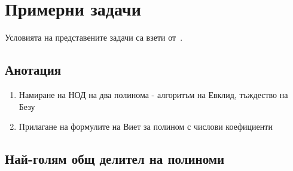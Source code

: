 \documentclass[numbers=endperiod, DIV=15, bibliography=totocnumbered]{scrartcl}
\begin{document}
\section{Примерни задачи}

Условията на представените задачи са взети от~\cite{PolynomialExercises}.

\subsection{Анотация}

\begin{enumerate}
  \item Намиране на НОД на два полинома - алгоритъм на Евклид, тъждество на Безу
  \item Прилагане на формулите на Виет за полином с числови коефициенти
\end{enumerate}

\subsection{Най-голям общ делител на полиноми}
\end{document}
